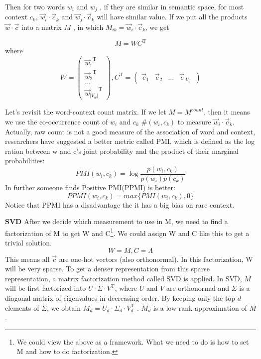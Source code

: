 \documentclass{article} %
\begin{document}
Then for two words $w_i$ and $w_j$ , if they are similar in semantic space, for most context $c_k$, $\vec{w}_i\cdot\vec{c}_k$ and $\vec{w}_j\cdot\vec{c}_k$ will have similar value. If we put all the products $\vec{w} \cdot\vec{c}$ into a matrix $M$ , in which $M_{ik}=\vec{w}_i\cdot\vec{c}_k$, we get

\begin{equation}
	M = WC^\mathrm{ T }
\end{equation}
where
\begin{equation}
	W = \begin{pmatrix} {\vec{w}_1}^\mathrm{ T } \\ {\vec{w}_2}^\mathrm{ T } \\ ... \\{\vec{w}_{|V_w|}}^\mathrm{ T }\end{pmatrix} , C^\mathrm{ T } = \begin{pmatrix} \vec{c}_1 & \vec{c}_2 & ... &\vec{c}_{|V_c|}\end{pmatrix}
\end{equation}


Let's revisit the word-context count matrix. If we let $M = M^{count}$, then it means we use the co-occurrence count of $w_i$ and $c_k$ $\#(w_i,c_k)$ to measure $\vec{w}_i\cdot\vec{c}_k$. Actually, raw count is not a good measure of the association of word and context, researchers have suggested a better metric called PMI. which is defined as the log ration between w and c's joint probability and the product of their marginal probabilities:
\begin{equation}
	PMI(w_i,c_k) = \log{\frac{p(w_i,c_k)}{p(w_i)p(c_k)}}
\end{equation}
In further someone finds Positive PMI(PPMI) is better:
\begin{equation}
	PPMI(w_i,c_k) = max\{PMI(w_i,c_k),0\}
\end{equation}
Notice that PPMI has a disadvantage the it has a big bias on rare context.

\textbf{SVD}
After we decide which measurement to use in M, we need to find a factorization of M to get W and C\footnote{We could view the above as a framework. What we need to do is how to set M and how to do factorization.}. We could assign W and C like this to get a trivial solution.
\begin{equation}
W = M , C = \Lambda
\end{equation}
This means all $\vec{c}$ are one-hot vectors (also orthonormal). In this factorization, W will be very sparse. To get a denser representation from this sparse representation, a matrix factorization method called SVD is applied.
In SVD, $M$ will be first factorized into $U\cdot\Sigma\cdot V^\mathrm{ T }$, where $U$ and $V$ are orthonormal and $\Sigma$ is a diagonal matrix of eigenvalues in decreasing order. By keeping only the top $d$ elements of $\Sigma$, we obtain $M_d = U_d\cdot\Sigma_d\cdot V_d^\mathrm{ T }$ . $M_d$ is a low-rank approximation of $M$.
\end{document}
